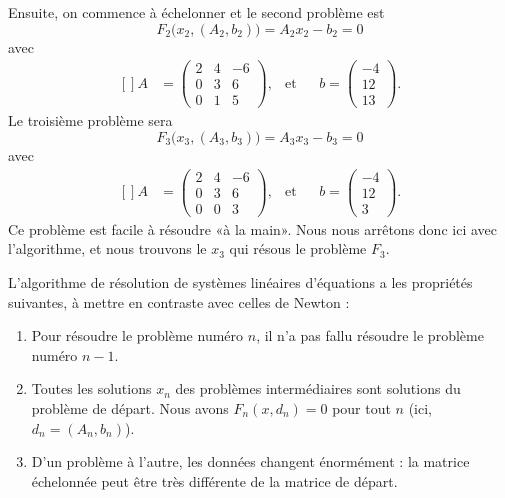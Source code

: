 Ensuite, on commence à échelonner et le second problème est
\begin{equation}
	F_2\big(x_2,(A_2,b_2)\big)=A_2x_2-b_2=0
\end{equation}
avec 
\begin{equation}
	\begin{aligned}[]
		A&=\begin{pmatrix}
			2	&	4	&	-6	\\
			0	&	3	&	6	\\
			0	&	1	&	5
		\end{pmatrix}, &\text{et}&&b=\begin{pmatrix}
			-4	\\ 
			12	\\ 
			13	
		\end{pmatrix}.
	\end{aligned}
\end{equation}
Le troisième problème sera
\begin{equation}
	F_3\big(x_3,(A_3,b_3)\big)=A_3x_3-b_3=0
\end{equation}
avec 
\begin{equation}
	\begin{aligned}[]
		A&=\begin{pmatrix}
			2	&	4	&	-6	\\
			0	&	3	&	6	\\
			0	&	0	&	3
		\end{pmatrix}, &\text{et}&&b=\begin{pmatrix}
			-4	\\ 
			12	\\ 
			3	
		\end{pmatrix}.
	\end{aligned}
\end{equation}
Ce problème est facile à résoudre «à la main». Nous nous arrêtons donc ici avec l'algorithme, et nous trouvons le $x_3$ qui résous le problème $F_3$.

L'algorithme de résolution de systèmes linéaires d'équations a les propriétés suivantes, à mettre en contraste avec celles de Newton :
\begin{enumerate}

	\item
		Pour résoudre le problème numéro $n$, il n'a pas fallu résoudre le problème numéro $n-1$.
	\item
		Toutes les solutions $x_n$ des problèmes intermédiaires sont solutions du problème de départ. Nous avons $F_n(x,d_n)=0$ pour tout $n$ (ici, $d_n=(A_n,b_n)$).
	\item
		D'un problème à l'autre, les données changent énormément : la matrice échelonnée peut être très différente de la matrice de départ.

\end{enumerate}


